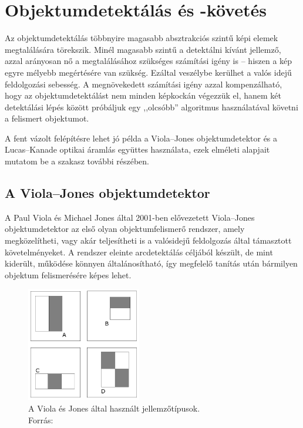 \newpage
\section{Objektumdetektálás és -követés}\label{sect:objdetect}

Az objektumdetektálás többnyire magasabb absztrakciós szintű képi elemek megtalálására törekszik. Minél magasabb szintű a detektálni kívánt jellemző, azzal arányosan nő a megtalálásához szükséges számítási igény is -- hiszen a kép egyre mélyebb megértésére van szükség. Ezáltal veszélybe kerülhet a valós idejű feldolgozási sebesség. A megnövekedett számítási igény azzal kompenzálható, hogy az objektumdetektálást nem minden képkockán végezzük el, hanem két detektálási lépés között próbáljuk egy ,,olcsóbb'' algoritmus használatával követni a felismert objektumot.

A fent vázolt felépítésre lehet jó példa a Viola--Jones objektumdetektor és a Lucas--Kanade optikai áramlás együttes használata, ezek elméleti alapjait mutatom be a szakasz további részében.

\subsection{A Viola--Jones objektumdetektor}\label{sect:viola}

A Paul Viola és Michael Jones által 2001-ben elővezetett \cite{vj} Viola--Jones objektumdetektor az első olyan objektumfelismerő rendszer, amely megközelítheti, vagy akár teljesítheti is a valósidejű feldolgozás által támasztott követelményeket. A rendszer eleinte arcdetektálás céljából készült, de mint kiderült, működése könnyen általánosítható, így megfelelő tanítás után bármilyen objektum felismerésére képes lehet.

\begin{figure}[!ht]
\centering
\includegraphics[width=50mm, keepaspectratio]{figures/features.png}
\caption{A Viola és Jones által használt jellemzőtípusok.\\Forrás: \cite{vj}}
\label{fig:features}
\end{figure}

